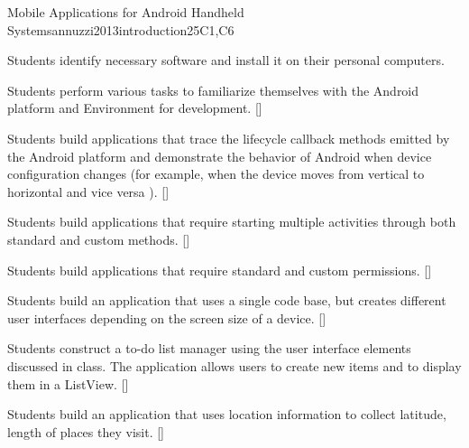 \begin{syllabus}
\begin{unit}{Mobile Applications for Android Handheld Systems}{}{annuzzi2013introduction}{25}{C1,C6}
\begin{learningoutcomes}
    \item Students identify necessary software and install it on their personal computers.
    \item Students perform various tasks to familiarize themselves with the Android platform and Environment for development. [\Usage]
    \item Students build applications that trace the lifecycle callback methods emitted by the Android platform and demonstrate the behavior of Android when device configuration changes (for example, when the device moves from vertical to horizontal and vice versa ). [\Usage]
    \item Students build applications that require starting multiple activities through both standard and custom methods. [\Usage]
    \item Students build applications that require standard and custom permissions. [\Usage]
    \item Students build an application that uses a single code base, but creates different user interfaces depending on the screen size of a device. [\Usage]
    \item Students construct a to-do list manager using the user interface elements discussed in class. The application allows users to create new items and to display them in a ListView. [\Usage]
    \item Students build an application that uses location information to collect latitude, length of places they visit. [\Usage]
\end{learningoutcomes}
\end{unit}

\begin{coursebibliography}
\end{coursebibliography}

\end{syllabus}

